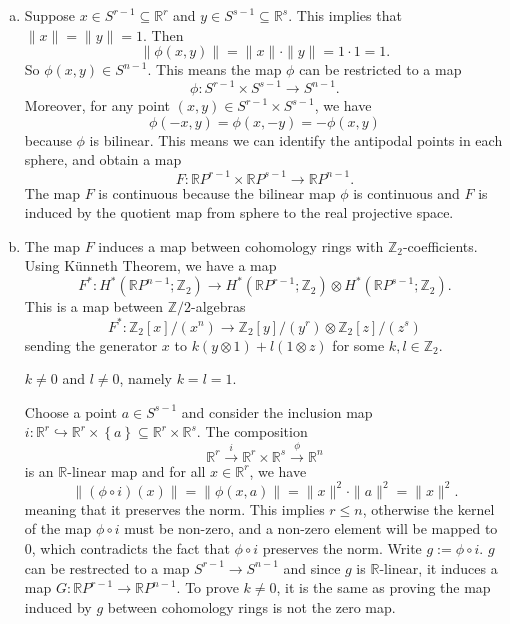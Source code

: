 \documentclass[letterpaper, 12pt]{article}
\begin{document}
\begin{solution}
\begin{enumerate}[(a)]
\item Suppose \(x\in S^{r-1}\subseteq \mathbb{R}^r\) and \(y\in S^{s-1}\subseteq \mathbb{R}^s\). This implies that \(\|x\|=\|y\|=1\). Then 
\[\|\phi(x,y)\|=\|x\|\cdot \|y\|=1\cdot 1=1.\]
So \(\phi(x,y)\in S^{n-1}\). This means the map \(\phi\) can be restricted to a map 
\[\phi:S^{r-1}\times S^{s-1}\rightarrow S^{n-1}.\]
Moreover, for any point \((x,y)\in S^{r-1}\times S^{s-1}\), we have 
\[\phi(-x,y)=\phi(x,-y)=-\phi(x,y)\]
because \(\phi\) is bilinear. This means we can identify the antipodal points in each sphere, and obtain a map 
\[F:\mathbb{R}P^{r-1}\times \mathbb{R}P^{s-1}\rightarrow \mathbb{R}P^{n-1}.\]
The map \(F\) is continuous because the bilinear map \(\phi\) is continuous and \(F\) is induced by the quotient map from sphere to the real projective space. 
\item The map \(F\) induces a map between cohomology rings with \(\mathbb{Z}_2\)-coefficients. Using Künneth Theorem, we have a map 
\[F^*:H^*(\mathbb{R}P^{n-1};\mathbb{Z}_2)\rightarrow H^*(\mathbb{R}P^{r-1};\mathbb{Z}_2)\otimes H^*(\mathbb{R}P^{s-1};\mathbb{Z}_2).\]
This is a map between \(\mathbb{Z}/2\)-algebras 
\[F^*:\mathbb{Z}_2[x]/(x^n)\rightarrow \mathbb{Z}_2[y]/(y^r)\otimes \mathbb{Z}_2[z]/(z^s)\]
sending the generator \(x\) to \(k(y\otimes 1)+l(1\otimes z)\) for some \(k,l\in \mathbb{Z}_2\). 
\begin{claim}
\(k\neq 0\) and \(l\neq 0\), namely \(k=l=1\).
\end{claim}
\begin{claimproof}
Choose a point \(a\in S^{s-1}\) and consider the inclusion map \(i:\mathbb{R}^r\hookrightarrow \mathbb{R}^r\times \left\{ a \right\}\subseteq \mathbb{R}^r\times \mathbb{R}^s\). The composition 
\[\mathbb{R}^r\xrightarrow{i}\mathbb{R}^r\times \mathbb{R}^s\xrightarrow{\phi}\mathbb{R}^n\]
is an \(\mathbb{R}\)-linear map and for all \(x\in \mathbb{R}^r\), we have 
\[\|(\phi\circ i)(x)\|=\|\phi(x,a)\|=\|x\|^2\cdot \|a\|^2=\|x\|^2.\]
meaning that it preserves the norm. This implies \(r\leq n\), otherwise the kernel of the map \(\phi\circ i\) must be non-zero, and a non-zero element will be mapped to \(0\), which contradicts the fact that \(\phi\circ i\) preserves the norm. Write \(g:=\phi\circ i\). \(g\) can be restrected to a map 
\(S^{r-1}\rightarrow S^{n-1}\) and since \(g\) is \(\mathbb{R}\)-linear, it induces a map \(G:\mathbb{R}P^{r-1}\rightarrow \mathbb{R}P^{n-1}\). To prove \(k\neq 0\), it is the same as proving the map induced by \(g\) between cohomology rings is not the zero map. 


\end{claimproof}
\end{enumerate}
\end{solution}
\end{document}

